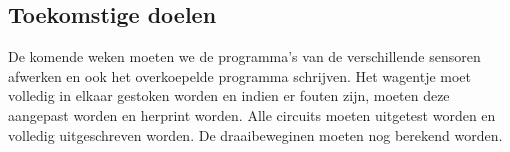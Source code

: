 \documentclass[kulak]{kulakarticle} %
\begin{document}
\subsection{Toekomstige doelen}
De komende weken moeten we de programma's van de verschillende sensoren afwerken en ook het overkoepelde programma schrijven. Het wagentje moet volledig in elkaar gestoken worden en indien er fouten zijn, moeten deze aangepast worden en herprint worden. Alle circuits moeten uitgetest worden en volledig uitgeschreven worden. De draaibeweginen moeten nog berekend worden. 
\end{document}
